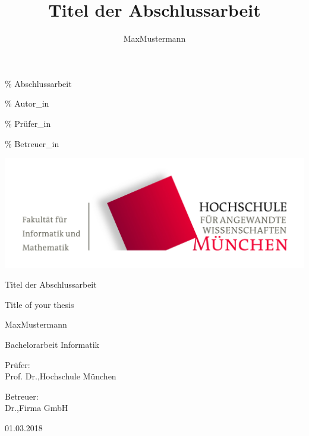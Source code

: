 \documentclass[listof=totoc,index=totoc,bibliography=totoc,12pt,ngerman,a4paper,]{report}
\begin{document}
\% Abschlussarbeit \newcommand{\titel}{Titel der Abschlussarbeit}
\newcommand{\titelEN}{Title of your thesis}
\newcommand{\datum}{01.03.2018}

\% Autor\_in \newcommand{\aVorname}{Max}
\newcommand{\aNachname}{Mustermann}
\newcommand{\aGeburtsdatum}{01.04.1998}
\newcommand{\aInstitution}{Hochschule München}
\newcommand{\aStudiengruppe}{IF7} \newcommand{\aSemester}{WS 17/2018}
\newcommand{\aMatrikelnummer}{12345678}

\newcommand{\aName}{\aVorname\space\aNachname}

\% Prüfer\_in \newcommand{\pTitle}{Prof. Dr.} \newcommand{\pVorname}{}
\newcommand{\pNachname}{} \newcommand{\pInstitution}{Hochschule München}

\% Betreuer\_in \newcommand{\bTitle}{Dr.} \newcommand{\bVorname}{}
\newcommand{\bNachname}{} \newcommand{\bInstitution}{Firma GmbH}

\title{Titel der Abschlussarbeit}
\author{Max\space Mustermann}

\begin{titlepage}
    \begin{center}
        \includegraphics[width=1\textwidth]{style/hm-fk07_logo.jpg}

        \Large
        Titel der Abschlussarbeit
        
        \normalsize
        Title of your thesis

        \vspace{0.5cm}
        \Large
        Max\space Mustermann

        \normalsize
        Bachelorarbeit Informatik

        \vfill

        \normalsize
        Prüfer:\\
        Prof. Dr.\space\space,\space Hochschule München


        \normalsize
        Betreuer:\\
        Dr.\space\space,\space Firma GmbH

        01.03.2018

    \end{center}
\end{titlepage}
\end{document}
